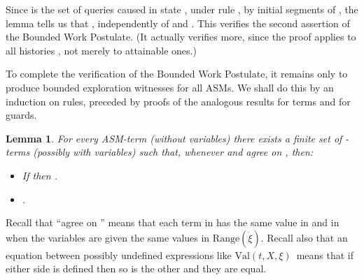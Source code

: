 \documentclass{LMCS}
\newtheorem{la}[thm]{Lemma}
\theoremstyle{definition}
\newenvironment{ls}{\begin{itemize}}{\end{itemize}}
\newcommand{\ans}{\dot}
\newcommand{\ran}[1]{\ensuremath{{\text{Range}}(#1)}}
\newcommand{\val}[3]{\ensuremath{\text{Val}(#1,#2,#3)}}
\begin{document}
Since  is the set of queries caused in state ,
under rule , by initial segments of , the lemma tells us that
, independently of  and .  This
verifies the second assertion of the Bounded Work Postulate.  (It
actually verifies more, since the proof applies to all histories
, not merely to attainable ones.)

To complete the verification of the Bounded Work Postulate, it remains
only to produce bounded exploration witnesses for all ASMs.  We shall
do this by an induction on rules, preceded by proofs of the analogous
results for terms and for guards.

\begin{la}
For every ASM-term  (without variables) there exists a finite set
 of -terms (possibly with variables) such that,
whenever  and  agree on , then:
\begin{ls}
  \item If  then .
  \item .
\end{ls}
\end{la}

Recall that ``agree on '' means that each term in  has the
same value in   and in  when the variables are given the same
values in \ran{\ans\xi}.  Recall also that an equation between
possibly undefined expressions like \val tX\xi\ means that if either
side is defined then so is the other and they are equal.
\end{document}
